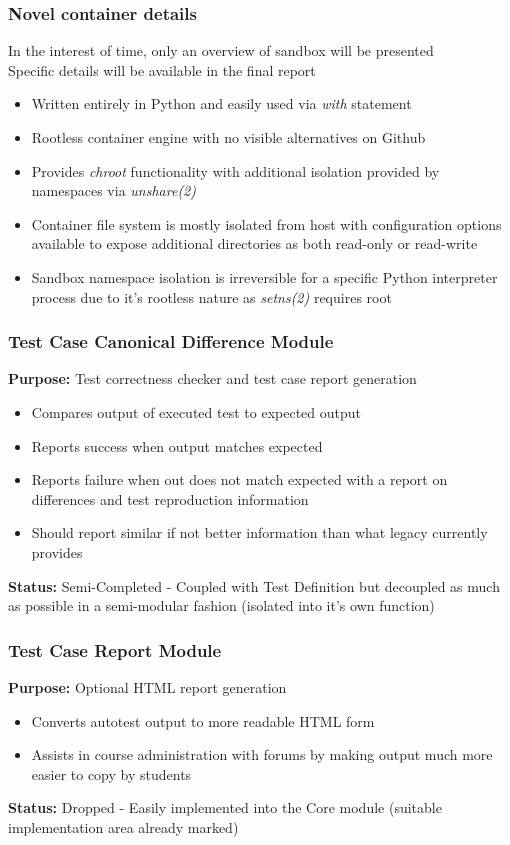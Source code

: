 \documentclass[xcolor, handout]{beamer}
\begin{document}
\begin{frame}
	\frametitle{Novel container details}
	In the interest of time, only an overview of sandbox will be presented\\
	Specific details will be available in the final report
	\begin{itemize}
		\setlength\itemsep{0.75em}
		\item Written entirely in Python and easily used via \textit{with} statement
			\pause
		\item Rootless container engine with no visible alternatives on Github
			\pause
		\item Provides \textit{chroot} functionality with additional isolation provided by namespaces via \textit{unshare(2)}
			\pause
		\item Container file system is mostly isolated from host with configuration options available to expose additional directories as both read-only or read-write
			\pause
		\item Sandbox namespace isolation is irreversible for a specific Python interpreter process due to it's rootless nature as \textit{setns(2)} requires root
	\end{itemize}
\end{frame}

\begin{frame}
	\frametitle{Test Case Canonical Difference Module}
	\textbf{Purpose:} Test correctness checker and test case report generation\\
	\begin{itemize}
		\item Compares output of executed test to expected output
			\pause
		\item Reports success when output matches expected
			\pause
		\item Reports failure when out does not match expected with a report on differences and test reproduction information
			\pause
		\item Should report similar if not better information than what legacy currently provides
			\pause
	\end{itemize}
	\textbf{Status:} Semi-Completed - Coupled with Test Definition but decoupled as much as possible in a semi-modular fashion (isolated into it's own function)
\end{frame}

\begin{frame}
	\frametitle{Test Case Report Module}
	\textbf{Purpose:} Optional HTML report generation\\
	\begin{itemize}
		\item Converts autotest output to more readable HTML form
			\pause
		\item Assists in course administration with forums by making output much more easier to copy by students
			\pause
	\end{itemize}
	\textbf{Status:} Dropped - Easily implemented into the Core module (suitable implementation area already marked)
\end{frame}
\end{document}
